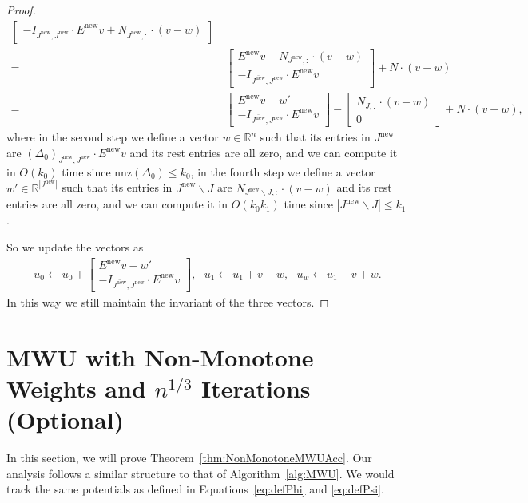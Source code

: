 \documentclass[11pt]{article}
\newcommand{\nnz}{\mathrm{nnz}}
\newcommand{\new}{\mathrm{new}}
\newcommand\uu{\boldsymbol{\mathit{u}}}
\newcommand\vv{\boldsymbol{\mathit{v}}}
\newcommand\ww{\boldsymbol{\mathit{w}}}
\newcommand\EE{\boldsymbol{\mathit{E}}}
\newcommand\II{\boldsymbol{\mathit{I}}}
\newcommand\NN{\boldsymbol{\mathit{N}}}
\newcommand\R{\mathbb{R}}
\begin{document}
\begin{proof}
\begin{align*}
\begin{bmatrix}
-\II_{\overline{J^{\new}},J^{\new}} \cdot \EE^{\new} \vv + \NN_{\overline{J^{\new}},:} \cdot (\vv - \ww)
\end{bmatrix} \\
= &~ \begin{bmatrix}
\EE^{\new} \vv - \NN_{J^{\new}, :} \cdot (\vv - \ww)\\
-\II_{\overline{J^{\new}},J^{\new}} \cdot \EE^{\new} \vv
\end{bmatrix} + \NN \cdot (\vv - \ww) \\
= &~ \begin{bmatrix}
\EE^{\new} \vv - \ww' \\
-\II_{\overline{J^{\new}},J^{\new}} \cdot \EE^{\new} \vv
\end{bmatrix} - \begin{bmatrix}
\NN_{J,:} \cdot (\vv - \ww) \\ 0
\end{bmatrix} + \NN \cdot (\vv - \ww),
\end{align*}
where in the second step we define a vector $\ww \in \R^n$ such that its entries in $J^{\new}$ are $(\Delta_0)_{J^{\new}, J^{\new}} \cdot \EE^{\new} \vv$ and its rest entries are all zero, and we can compute it in $O(k_0)$ time since $\nnz(\Delta_0) \leq k_0$, in the fourth step we define a vector $\ww' \in \R^{|J^{\new}|}$ such that its entries in $J^{\new} \backslash J$ are $\NN_{J^{\new}\backslash J, :} \cdot (\vv - \ww)$ and its rest entries are all zero, and we can compute it in $O(k_0 k_1)$ time since $|J^{\new}\backslash J| \leq k_1$.

So we update the vectors as
\begin{align*}
\uu_0 \gets \uu_0 + \begin{bmatrix}
\EE^{\new} \vv - \ww' \\
-\II_{\overline{J^{\new}},J^{\new}} \cdot \EE^{\new} \vv
\end{bmatrix}, ~~~
\uu_1 \gets \uu_1 + \vv - \ww, ~~~
\uu_w \gets \uu_1 - \vv + \ww.
\end{align*}
In this way we still maintain the invariant of the three vectors.
\end{proof}
 
\section{MWU with Non-Monotone Weights and \texorpdfstring{$n^{1/3}$}{TEXT} Iterations (Optional)}\label{sec:NonMonMWU}


In this section, we will prove Theorem~\ref{thm:NonMonotoneMWUAcc}. Our analysis follows a similar structure to that of Algorithm~\ref{alg:MWU}. We would track the same potentials as defined in Equations~\eqref{eq:defPhi} and \eqref{eq:defPsi}. 
\end{document}
